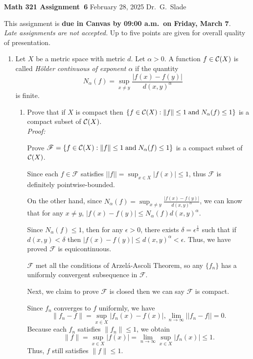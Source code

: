 \documentclass[hidelinks]{article}
\begin{document}
\pagestyle{empty}


\noindent
{\bf\large Math 321   Assignment~6}
\hfill February 28, 2025
\hfill {Dr.\ G.\ Slade}

\medskip \noindent
This assignment is {\bf due in Canvas by 09:00 a.m.\ on Friday, March 7}.
\\
\emph{Late assignments are not accepted.}
Up to five points are given for overall quality of presentation.



\begin{enumerate}


\item
Let $X$ be a metric space with metric $d$.  Let $\alpha >0$.
A function $f \in {\cal C}(X)$ is called
\emph{H\"older continuous of exponent $\alpha$} if the quantity
\[
    N_\alpha(f) = \sup_{x\neq y}\frac{|f(x)-f(y)|}{d(x,y)^\alpha}
\]
is finite.
\begin{enumerate}
\item
Prove that if $X$ is compact then
$\{f \in {\cal C}(X) : \|f\| \le 1 \; \text{and}\; N_\alpha(f) \le 1\}$ is a compact subset
of ${\cal C}(X)$.
\\

\textit{Proof:}

Prove $\mathscr{F} = \{f \in {\cal C}(X) : \|f\| \le 1 \; \text{and}\; N_\alpha(f) \le 1\}$ is a compact subset of ${\cal C}(X)$.

Since each $f\in \mathscr{F}$ satisfies $||f||=\sup_{x\in X} |f(x)|\leq1$, thus $\mathscr{F}$ is definitely pointwise-bounded.

On the other hand, since $N_\alpha(f) = \sup_{x\neq y}\frac{|f(x)-f(y)|}{d(x,y)^\alpha}$, we can know that for any $x\neq y$, $|f(x)-f(y)|\leq N_\alpha(f)d(x,y)^\alpha$.

Since $N_\alpha(f)\leq1$, then for any $\epsilon>0$, there exists $\delta=\epsilon^{\frac{1}{\alpha}}$ such that if $d(x,y)<\delta$ then $|f(x)-f(y)|\leq d(x,y)^\alpha<\epsilon$. Thus, we have proved $\mathscr{F}$ is equicontinuous.

$\mathscr{F}$ met all the conditions of Arzelá-Ascoli Theorem, so any $\{f_n\}$ has a uniformly convergent subsequence in $\mathscr{F}$.

Next, we claim to prove $\mathscr{F}$ is closed then we can say $\mathscr{F}$ is compact.
 
Since \( f_n \) converges to \( f \) uniformly, we have
\[
\|f_n - f\| = \sup_{x \in X} |f_n(x) - f(x)|,  \lim_{n \to \infty}||f_n-f||=0.
\]
Because each \( f_n \) satisfies \( \|f_n\| \leq 1 \), we obtain
\[
\|f\| = \sup_{x \in X} |f(x)| = \lim_{n \to \infty} \sup_{x \in X} |f_n(x)| \leq 1.
\]
Thus, \( f \) still satisfies \( \|f\| \leq 1 \).


\end{enumerate}
\end{enumerate}
\end{document}

